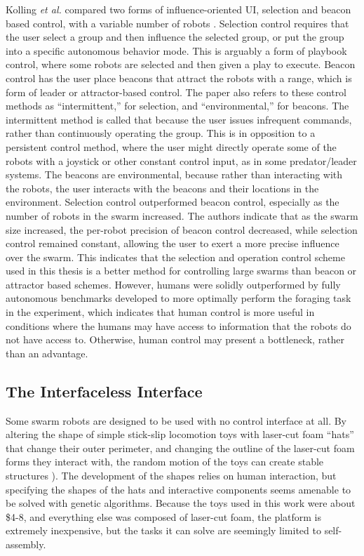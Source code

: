 Kolling \emph{et al.} compared two forms of influence-oriented UI, selection and beacon based control, with a variable number of robots \citep{kolling2013human}. 
Selection control requires that the user select a group and then influence the selected group, or put the group into a specific autonomous behavior mode. 
This is arguably a form of playbook control, where some robots are selected and then given a play to execute. 
Beacon control has the user place beacons that attract the robots with a range, which is form of leader or attractor-based control. 
The paper also refers to these control methods as ``intermittent,'' for selection, and ``environmental,'' for beacons. 
The intermittent method is called that because the user issues infrequent commands, rather than continuously operating the group. 
This is in opposition to a persistent control method, where the user might directly operate some of the robots with a joystick or other constant control input, as in some predator/leader systems. 
The beacons are environmental, because rather than interacting with the robots, the user interacts with the beacons and their locations in the environment. 
Selection control outperformed beacon control, especially as the number of robots in the swarm increased. 
The authors indicate that as the swarm size increased, the per-robot precision of beacon control decreased, while selection control remained constant, allowing the user to exert a more precise influence over the swarm. 
This indicates that the selection and operation control scheme used in this thesis is a better method for controlling large swarms than beacon or attractor based schemes. 
However, humans were solidly outperformed by fully autonomous benchmarks developed to more optimally perform the foraging task in the experiment, which indicates that human control is more useful in conditions where the humans may have access to information that the robots do not have access to. 
Otherwise, human control may present a bottleneck, rather than an advantage. 

\subsection{The Interfaceless Interface} \label{section:The_Interfaceless_Interface}

Some swarm robots are designed to be used with no control interface at all.
By altering the shape of simple stick-slip locomotion toys with laser-cut foam ``hats'' that change their outer perimeter, and changing the outline of the laser-cut foam forms they interact with, the random motion of the toys can create stable structures \citep{andreen2016emergent}).
The development of the shapes relies on human interaction, but specifying the shapes of the hats and interactive components seems amenable to be solved with genetic algorithms. 
Because the toys used in this work were about \$4-8, and everything else was composed of laser-cut foam, the platform is extremely inexpensive, but the tasks it can solve are seemingly limited to self-assembly. 

